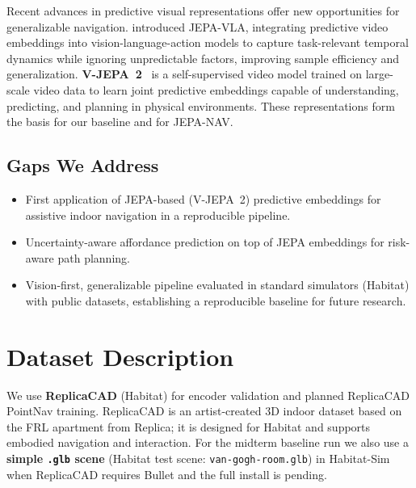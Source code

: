 \documentclass{article}
\begin{document}
Recent advances in predictive visual representations offer new opportunities for
generalizable navigation. \citet{miao_jepa-vla_2026} introduced JEPA-VLA, integrating
predictive video embeddings into vision-language-action models to capture task-relevant
temporal dynamics while ignoring unpredictable factors, improving sample efficiency and
generalization. \textbf{V-JEPA~2}~\cite{assran2025v} is a self-supervised video model
trained on large-scale video data to learn joint predictive embeddings capable of
understanding, predicting, and planning in physical environments. These representations
form the basis for our baseline and for JEPA-NAV.

\subsection{Gaps We Address}

\begin{itemize}
  \item First application of JEPA-based (V-JEPA~2) predictive embeddings for assistive
        indoor navigation in a reproducible pipeline.
  \item Uncertainty-aware affordance prediction on top of JEPA embeddings for
        risk-aware path planning.
  \item Vision-first, generalizable pipeline evaluated in standard simulators (Habitat)
        with public datasets, establishing a reproducible baseline for future research.
\end{itemize}

\section{Dataset Description}

We use \textbf{ReplicaCAD} (Habitat) for encoder validation and planned ReplicaCAD
PointNav training. ReplicaCAD is an artist-created 3D indoor dataset based on the FRL
apartment from Replica; it is designed for Habitat and supports embodied navigation and
interaction. For the midterm baseline run we also use a \textbf{simple \texttt{.glb}
scene} (Habitat test scene: \texttt{van-gogh-room.glb}) in Habitat-Sim when ReplicaCAD
requires Bullet and the full install is pending.
\end{document}
